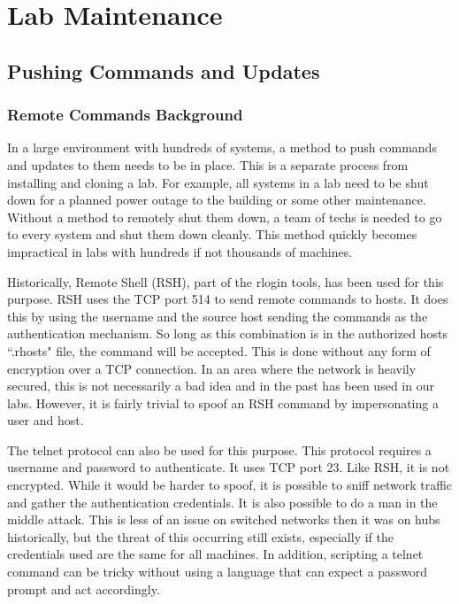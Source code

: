 \chapter{Lab Maintenance} \label{ch:lab_maintenance}
\section{Pushing Commands and Updates} \label{sec:SSH_push}
\subsection{Remote Commands Background}
In a large environment with hundreds of systems, a method to push commands and updates to them needs to be in place.  This is a separate process from installing and cloning a lab.  For example, all systems in a lab need to be shut down for a planned power outage to the building or some other maintenance.  Without a method to remotely shut them down, a team of techs is needed to go to every system and shut them down cleanly.  This method quickly becomes impractical in labs with hundreds if not thousands of machines.  

Historically, Remote Shell (RSH), part of the rlogin tools, has been used for this purpose.  RSH uses the TCP port 514 to send remote commands to hosts.  It does this by using the username and the source host sending the commands as the authentication mechanism.  So long as this combination is in the authorized hosts ``.rhosts" file, the command will be accepted.  This is done without any form of encryption over a TCP connection.  In an area where the network is heavily secured, this is not necessarily a bad idea and in the past has been used in our labs.  However, it is fairly trivial to spoof an RSH command by impersonating a user and host.  

The telnet protocol can also be used for this purpose.  This protocol requires a username and password to authenticate.  It uses TCP port 23.  Like RSH, it is not encrypted.  While it would be harder to spoof, it is possible to sniff network traffic and gather the authentication credentials.  It is also possible to do a man in the middle attack.  This is less of an issue on switched networks then it was on hubs historically, but the threat of this occurring still exists, especially if the credentials used are the same for all machines.  In addition, scripting a telnet command can be tricky without using a language that can expect a password prompt and act accordingly.

